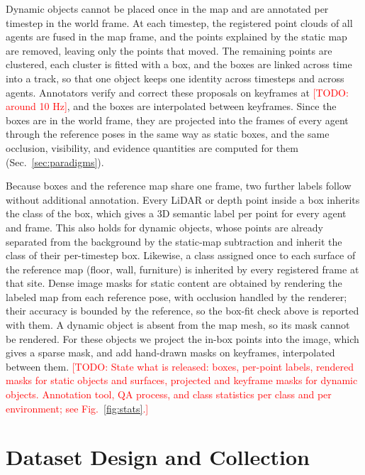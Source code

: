 \documentclass[journal]{IEEEtran}
\newcommand{\todo}[1]{\textcolor{red}{[TODO: #1]}}
\begin{document}
Dynamic objects cannot be placed once in the map and are annotated
per timestep in the world frame. At each timestep, the registered
point clouds of all agents are fused in the map frame, and the
points explained by the static map are removed, leaving only the
points that moved. The remaining points are clustered, each cluster
is fitted with a box, and the boxes are linked across time into a
track, so that one object keeps one identity across timesteps and
across agents. Annotators verify and correct these proposals on
keyframes at \todo{around 10 Hz}, and the boxes are interpolated
between keyframes. Since the boxes are in the world frame, they are
projected into the frames of every agent through the reference poses
in the same way as static boxes, and the same occlusion, visibility,
and evidence quantities are computed for them
(Sec.~\ref{sec:paradigms}).

Because boxes and the reference map share one frame, two further
labels follow without additional annotation. Every LiDAR or depth
point inside a box inherits the class of the box, which gives a 3D
semantic label per point for every agent and frame. This also holds
for dynamic objects, whose points are already separated from the
background by the static-map subtraction and inherit the class of
their per-timestep box. Likewise, a class assigned once to each
surface of the reference map (floor, wall, furniture) is inherited by
every registered frame at that site. Dense image masks for static
content are obtained by rendering the labeled map from each
reference pose, with occlusion handled by the renderer; their
accuracy is bounded by the reference, so the box-fit check above is
reported with them. A dynamic object is absent from the map mesh, so
its mask cannot be rendered. For these objects we project the in-box
points into the image, which gives a sparse mask, and add hand-drawn
masks on keyframes, interpolated between them. \todo{State what is
released: boxes, per-point labels, rendered masks for static objects
and surfaces, projected and keyframe masks for dynamic objects.
Annotation tool, QA process, and class statistics per class and per
environment; see Fig.~\ref{fig:stats}.}



\section{Dataset Design and Collection}
\label{sec:collection}
\end{document}
